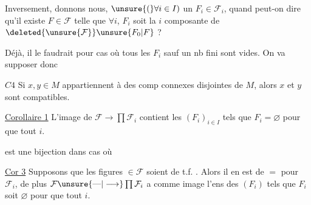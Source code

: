 Inversement, donnons nous,  $\unsure{(}\forall i\in I)$ un $F_i\in\mathcal F_i$, quand peut-on dire qu'il existe $F\in\mathcal F$ telle que $\forall i$, $F_i$ soit la $i$ composante de $\deleted{\unsure{\mathcal F}}\unsure{F_0|F}$ ?

Déjà, il le faudrait pour  cas où tous les $F_i$ sauf un nb fini sont \deleted{$\varnothing$} vides. On va supposer donc

\uline{$C4$} Si $x,y\in M$ appartiennent à des comp connexes disjointes de $M$, alors $x$ et $y$ sont compatibles.

 

\uline{Corollaire 1} L'image de $\mathcal F\to\prod\mathcal F_i$ contient les $(F_i)_{i\in I}$ tels que $F_i=\varnothing$  pour  que tout $i$.

est une bijection dans   cas où  



\uline{Cor 3} Supposons que les figures  $\in\mathcal F$ soient de t.f.  . Alors il en est de $=$  pour $\mathcal F_i$, de plus $\mathcal F\unsure{\text{---}|\longrightarrow}\prod\mathcal F_i$ a comme image l'ens des $(F_i)$ tels que $F_i$ soit $\varnothing$ pour  que tout $i$.

